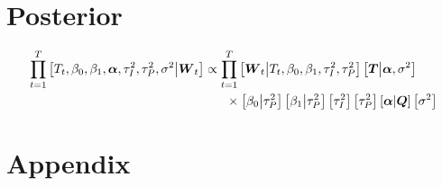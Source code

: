 \documentclass{article}\usepackage[]{graphicx}\usepackage[]{color}
\def\bm#1{\mbox{\boldmath $#1$}}
\begin{document}
\section{Posterior}
%
\begin{align*}
%
\prod_{t = 1}^T \left[ T_t, \beta_0, \beta_1, \bm{\alpha}, \tau^2_I, \tau^2_P, \sigma^2 \middle| \bm{W}_t \right] & \propto \prod_{t = 1}^T \left[ \bm{W}_t \middle| T_t, \beta_0, \beta_1, \tau^2_I, \tau^2_P \right] \left[ \bm{T} \middle| \bm{\alpha}, \sigma^2 \right] \\ 
& \hspace{6mm} \times \left[ \beta_0 \middle| \tau^2_P \right] \left[ \beta_1 \middle| \tau^2_P \right] \left[ \tau^2_I \right] \left[ \tau^2_P \right] \left[ \bm{\alpha} \middle| \bm{Q} \right] \left[ \sigma^2 \right] 
%
\end{align*}
%
%
\section{Appendix}
%
%
\end{document}
